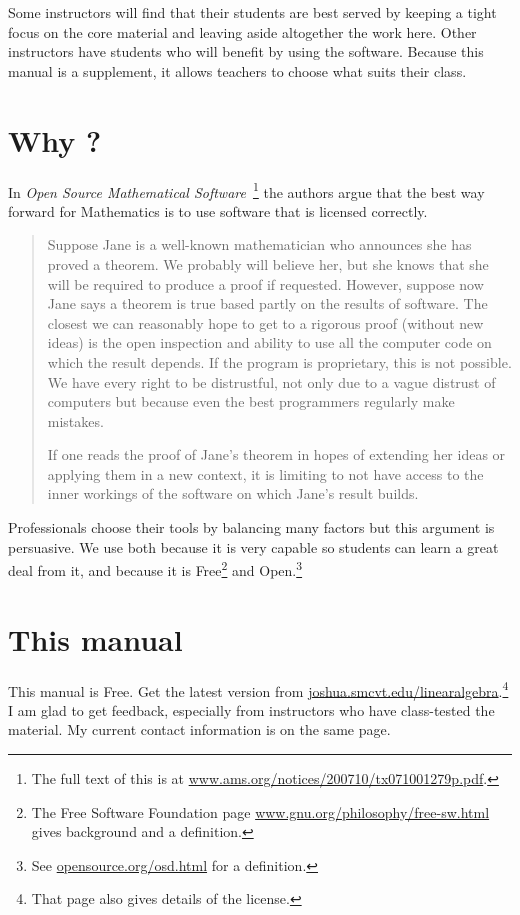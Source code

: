 Some instructors will find that their students are best served by
keeping a tight focus on the
core material and leaving aside altogether 
the work here. 
Other instructors
have students who will benefit by using the software.
Because this manual is a supplement, it allows 
teachers to choose what suits their class.


\section{Why \Sage?}
In 
\textit{Open Source Mathematical Software\,} \citep{JoynerStein07}\footnote{The full text of this is at
\protect\url{www.ams.org/notices/200710/tx071001279p.pdf}.}
the authors argue that the best way forward for Mathematics 
is to use software that is licensed correctly.

\begin{quotation}\small
Suppose Jane is a well-known mathematician who announces
she has proved a theorem. We probably will believe
her, but she knows that she will be required to produce
a proof if requested. However, suppose now Jane says a
theorem is true based partly on the results of software. The
closest we can reasonably hope to get to a rigorous proof
(without new ideas) is the open inspection and ability to use
all the computer code on which the result depends. If the
program is proprietary, this is not possible. We have every
right to be distrustful, not only due to a vague distrust of
computers but because even the best programmers regularly
make mistakes.

If one reads the proof of Jane’s theorem in hopes of
extending her ideas or applying them in a new context, it
is limiting to not have access to the inner workings of the
software on which Jane’s result builds.
\end{quotation}  
Professionals choose their tools by balancing many factors but
this argument is persuasive.
We use \Sage{} both because it is very capable 
so students can 
learn a great deal from it,
and because it is 
Free\footnote{The Free Software Foundation page 
\protect\url{www.gnu.org/philosophy/free-sw.html} 
gives background and a definition.} 
and Open.\footnote{See \protect\url{opensource.org/osd.html} 
for a definition.} 



\section{This manual}
This manual is Free.
Get the latest version from 
\url{joshua.smcvt.edu/linearalgebra}.\footnote{%
  That page also gives details of the license.}
I am glad to get feedback, especially from instructors
who have class-tested the material.
My current contact information is on the same page.

